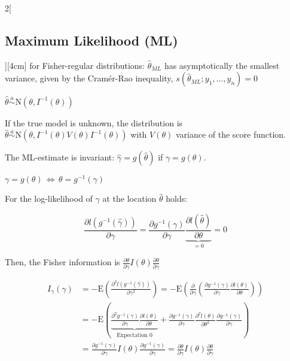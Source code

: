 \documentclass[8pt]{extarticle}
\begin{document}
\begin{multicols}{2}[\subsection{Maximum Likelihood (ML)}][4cm]
\noindent for Fisher-regular distributions: $\hat{\theta}_{ML}$ has asymptotically the smallest variance, given by the Cramér-Rao inequality, 
   $s\left(\hat{\theta}_{ML};y_1,...,y_n\right) = 0$
   
$\hat{\theta} \overset{a}{\sim} \mathrm{N}\left(\theta, I^{-1}(\theta)\right)$

\noindent If the true model is unknown, the distribution is $\hat{\theta} \overset{a}{\sim} \mathrm{N}\left(\theta, I^{-1}(\theta)V(\theta)I^{-1}(\theta)\right)$ with $V(\theta)$ variance of the score function.
   
\noindent The ML-estimate is invariant: $\hat{\gamma} = g(\hat{\theta})$ if $\gamma = g(\theta)$. 
   
\begin{Proof}
$\gamma = g(\theta)\, \Leftrightarrow \,\theta = g^{-1}(\gamma)$

\noindent For the log-likelihood of $\gamma$ at the location $\hat{\theta}$ holds:

$$\frac{\partial l(g^{-1}(\hat{\gamma}))}{\partial \gamma} = \frac{\partial g^{-1}(\gamma)}{\partial\gamma} \underbrace{\frac{\partial l(\hat{\theta})}{\partial \theta}}_{=0} = 0$$
\end{Proof}   

\noindent Then, the Fisher information is $\frac{\partial\theta}{\partial\gamma} I(\theta) \frac{\partial\theta}{\partial\gamma}$

\begin{Proof}
\vspace{-1.5em}
\begin{align*}
I_{\gamma}(\gamma) &= 
-\mathrm{E}\left(\frac{\partial^2 l(g^{-1}(\hat{\gamma}))}{\partial \gamma^2} \right)= 
-\mathrm{E}\left(\frac{\partial}{\partial\gamma} \left( \frac{\partial g^{-1}(\gamma)}{\partial\gamma} \frac{\partial l(\theta)}{\partial\theta} \right)\right) \\
&= -\mathrm{E}\left(\underbrace{\frac{\partial^2 g^{-1}(\gamma)}{\partial\gamma}\frac{\partial l(\theta)}{\partial\theta}}_{\text{Expectation 0}} + \frac{\partial g^{-1}(\gamma)}{\partial\gamma}\frac{\partial^2l(\theta)}{\partial\theta^2}\frac{\partial g^{-1}(\gamma)}{\partial\gamma}\right) \\
&= \frac{\partial g^{-1}(\gamma)}{\partial\gamma} I(\theta) \frac{\partial g^{-1}(\gamma)}{\partial\gamma} = \frac{\partial \theta}{\partial\gamma} I(\theta) \frac{\partial \theta}{\partial\gamma}
\end{align*}
\end{Proof}


\end{multicols}
\end{document}
